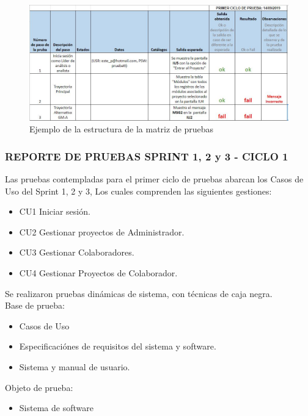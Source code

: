 \begin{figure}[H]
	\begin{center}
		\includegraphics[width=.95\textwidth]{images/pruebas/diseno/tabla}
		\caption{Ejemplo de la estructura de la matriz de pruebas}
		\label{fig:estructura}
	\end{center}
\end{figure}

\subsubsection{REPORTE DE PRUEBAS SPRINT 1, 2 y 3 - CICLO 1}

Las pruebas contempladas para el primer ciclo de pruebas abarcan los Casos de Uso del Sprint 1, 2 y 3, Los cuales comprenden las siguientes gestiones:

\begin{itemize}
	\item CU1 Iniciar sesión.
	\item CU2 Gestionar proyectos de Administrador.
	\item CU3 Gestionar Colaboradores.
	\item CU4 Gestionar Proyectos de Colaborador.
\end{itemize}

Se realizaron pruebas dinámicas de sistema, con técnicas de caja negra.\\

Base de prueba:
\begin{itemize}
	\item Casos de Uso
	\item Especificaciónes de requisitos del sistema y software.
	\item Sistema y manual de usuario.
\end{itemize}

Objeto de prueba:
\begin{itemize}
	\item Sistema de software
\end{itemize}

